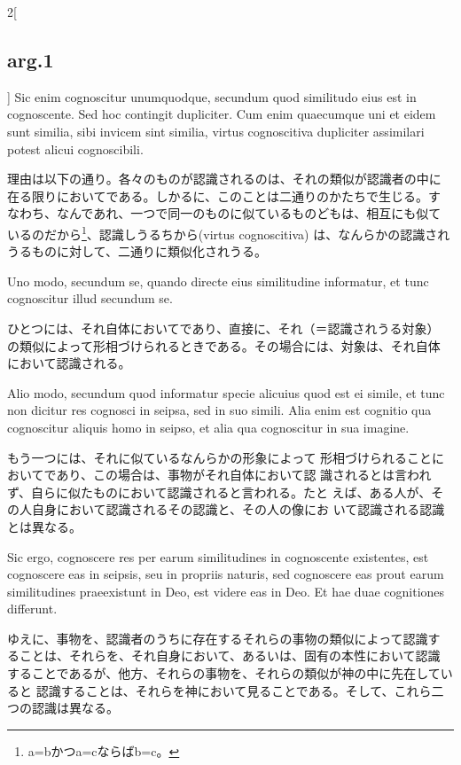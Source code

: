 \documentclass[paper=a4paper,fontsize=10pt,jafontsize=9pt,titlepage]{jlreq}
\begin{document}
\begin{paracol}{2}[\subsection{arg.1}]
Sic enim cognoscitur unumquodque, secundum quod similitudo eius est in
cognoscente. Sed hoc contingit dupliciter. Cum enim quaecumque uni et
eidem sunt similia, sibi invicem sint similia, virtus cognoscitiva
dupliciter assimilari potest alicui cognoscibili.

\switchcolumn

理由は以下の通り。各々のものが認識されるのは、それの類似が認識者の中に
在る限りにおいてである。しかるに、このことは二通りのかたちで生じる。す
なわち、なんであれ、一つで同一のものに似ているものどもは、相互にも似て
いるのだから\footnote{a=bかつa=cならばb=c。}、認識しうるちから(virtus cognoscitiva)
は、なんらかの認識されうるものに対して、二通りに類似化されうる。

\switchcolumn*

Uno modo, secundum se, quando directe eius similitudine informatur, et
tunc cognoscitur illud secundum se.

\switchcolumn

ひとつには、それ自体においてであり、直接に、それ（＝認識されうる対象）
の類似によって形相づけられるときである。その場合には、対象は、それ自体
において認識される。

\switchcolumn*

Alio
modo, secundum quod informatur specie alicuius quod est ei simile, et
tunc non dicitur res cognosci in seipsa, sed in suo simili. Alia enim
est cognitio qua cognoscitur aliquis homo in seipso, et alia qua
cognoscitur in sua imagine.

\switchcolumn

もう一つには、それに似ているなんらかの形象によって
形相づけられることにおいてであり、この場合は、事物がそれ自体において認
識されるとは言われず、自らに似たものにおいて認識されると言われる。たと
えば、ある人が、その人自身において認識されるその認識と、その人の像にお
いて認識される認識とは異なる。

\switchcolumn*

Sic ergo, cognoscere res per earum similitudines in cognoscente
existentes, est cognoscere eas in seipsis, seu in propriis naturis,
sed cognoscere eas prout earum similitudines praeexistunt in Deo, est
videre eas in Deo. Et hae duae cognitiones differunt.

\switchcolumn

ゆえに、事物を、認識者のうちに存在するそれらの事物の類似によって認識す
ることは、それらを、それ自身において、あるいは、固有の本性において認識
することであるが、他方、それらの事物を、それらの類似が神の中に先在していると
認識することは、それらを神において見ることである。そして、これら二
つの認識は異なる。


\end{paracol}
\end{document}
